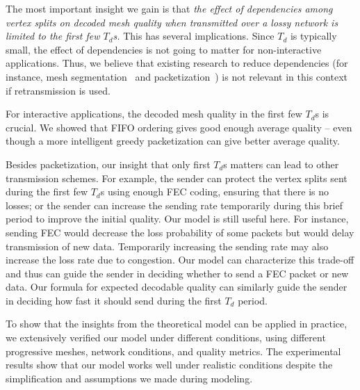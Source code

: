 The most important insight we gain is that \textit{the effect of
dependencies among vertex splits on decoded mesh quality when transmitted
over a lossy network is limited to the first few $T_d$s.}  This has
several implications.  Since $T_d$ is typically small, the effect of
dependencies is not going to matter for non-interactive applications.
Thus, we believe that existing research to reduce dependencies 
(for instance, mesh segmentation~\cite{error:Park,error:Yan} and
packetization~\cite{Gu:Packetization}) is not relevant in this
context if retransmission is used.

For interactive applications, the decoded mesh quality in the
first few $T_d$s is crucial.  We showed that FIFO ordering
gives good enough average quality -- even though a more intelligent
greedy packetization can give better average
quality. %

Besides packetization, our insight that only
first $T_d$s matters can lead to other transmission
schemes. For example, the sender can protect the vertex splits sent
during the first few $T_d$s using enough FEC coding, ensuring that
there is no losses; or the sender can increase the sending rate
temporarily during this brief period to improve the initial quality.
Our model is still useful here.  For instance, sending FEC would
decrease the loss probability of some packets but would delay
transmission of new data. 
Temporarily increasing the sending rate
may also increase the loss rate due to congestion. 
Our model can characterize this trade-off
and thus can guide the sender in deciding whether to send a FEC
packet or new data.  Our formula for expected decodable quality can
similarly guide the sender in deciding how fast it should send
during the first $T_d$ period.

To show that the insights from the theoretical model can be applied
in practice, we extensively verified our model under different conditions,
using different progressive meshes, network conditions, and quality metrics. 
The experimental results show that our model works well under realistic 
conditions despite the simplification and assumptions we made during
modeling.


